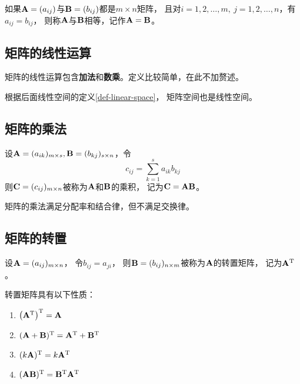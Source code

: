 \begin{definition}[矩阵相等]
  如果$\mathbf{A}=(a_{ij})$与$\mathbf{B}=(b_{ij})$都是$m\times n$矩阵，
  且对$i=1,2,\dots,m,\ j=1,2,\dots,n$，有$a_{ij}=b_{ij}$，
  则称$\mathbf{A}$与$\mathbf{B}$相等，记作$\mathbf{A}=\mathbf{B}$。
\end{definition}

\subsection{矩阵的线性运算}
矩阵的线性运算包含\textbf{加法}和\textbf{数乘}。定义比较简单，在此不加赘述。

根据后面线性空间的定义\ref{def-linear-space}，
矩阵空间也是线性空间。

\subsection{矩阵的乘法}
\begin{definition}[矩阵的乘法]
  设$\mathbf{A}=(a_{ik})_{m\times s}, \mathbf{B}=(b_{kj})_{s\times n}$，令
  \begin{equation}
  c_{ij}=\sum_{k=1}^{s}a_{ik}b_{kj}
  \end{equation}
  则$\mathbf{C}=(c_{ij})_{m\times n}$被称为$\mathbf{A}$和$\mathbf{B}$的乘积，
  记为$\mathbf{C} = \mathbf{A}\mathbf{B}$。
\end{definition}

矩阵的乘法满足分配率和结合律，但不满足交换律。

\subsection{矩阵的转置}
\begin{definition}[矩阵的转置]
    设$\mathbf{A}=(a_{ij})_{m\times n}$，
    令$b_{ij}=a_{ji}$，
    则$\mathbf{B}=(b_{ij})_{n\times m}$被称为$\mathbf{A}$的转置矩阵，
    记为$\mathbf{A}^{\textrm{T}}$。
\end{definition}

\begin{theorem}[转置矩阵的性质]
  转置矩阵具有以下性质：
  \begin{enumerate}
    \item $\left(\mathbf{A}^{\textrm{T}}\right)^{\textrm{T}} = \mathbf{A}$
    \item $(\mathbf{A}+\mathbf{B})^{\textrm{T}}=\mathbf{A}^{\textrm{T}} + \mathbf{B}^{\textrm{T}}$
    \item $(k\mathbf{A})^{\textrm{T}}=k\mathbf{A}^{\textrm{T}}$
    \item $(\mathbf{A}\mathbf{B})^{\textrm{T}}=\mathbf{B}^{\textrm{T}}\mathbf{A}^{\textrm{T}}$
  \end{enumerate}
\end{theorem}

